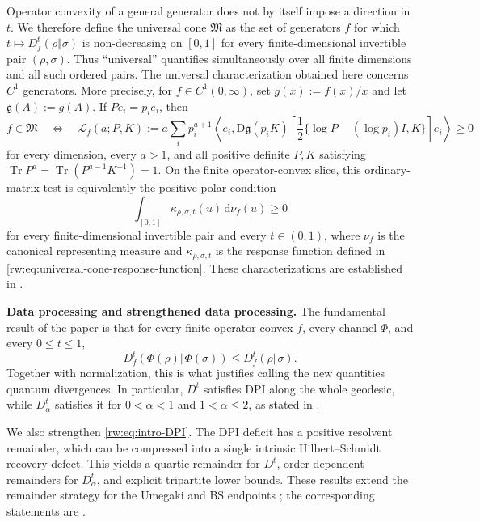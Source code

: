 \documentclass[11pt]{article}
\theoremstyle{remark}
\newcommand{\1}{\mathbbm{1}}
\begin{document}
Operator convexity of a general generator does not by itself impose
a direction in $t$.  We therefore define the universal cone
$\mathfrak M$ as the set of generators $f$ for which
$t\mapsto D_f^t(\rho\Vert\sigma)$ is non-decreasing on $[0,1]$ for
every finite-dimensional invertible pair $(\rho,\sigma)$.  Thus
``universal'' quantifies simultaneously over all finite dimensions
and all such ordered pairs.
The universal characterization obtained here concerns $C^1$
generators.  More precisely, for $f\in C^1(0,\infty)$, set
$g(x):=f(x)/x$ and let $\mathfrak g(A):=g(A)$.  If
$Pe_i=p_i e_i$, then
\begin{equation*}
 f\in\mathfrak M
 \quad\Longleftrightarrow\quad
 \mathcal L_f(a;P,K)
 :=a\sum_i p_i^{a+1}
 \left\langle e_i,
 \mathrm D\mathfrak g(p_iK)
 \left[\frac12\{\log P-(\log p_i)I,K\}\right]e_i
 \right\rangle\geq0
\end{equation*}
for every dimension, every $a>1$, and all positive definite $P,K$
satisfying
$\operatorname{Tr}P^a=\operatorname{Tr}(P^{a-1}K^{-1})=1$.
On the finite operator-convex slice, this ordinary-matrix test is
equivalently the positive-polar condition
\begin{equation*}
 \int_{[0,1]}\kappa_{\rho,\sigma,t}(u)\,
 \mathrm d\nu_f(u)\geq0
\end{equation*}
for every finite-dimensional invertible pair and every $t\in(0,1)$,
where $\nu_f$ is the canonical representing measure and
$\kappa_{\rho,\sigma,t}$ is the response function defined in
\eqref{rw:eq:universal-cone-response-function}.  These characterizations
are established in
.

\medskip
\noindent\textbf{Data processing and strengthened data processing.}
The fundamental result of the paper is that for every finite
operator-convex $f$, every channel $\Phi$, and every
$0\leq t\leq1$,
\begin{equation}
 \boxed{
 D_f^t\!\left(\Phi(\rho)\Vert\Phi(\sigma)\right)
 \leq D_f^t(\rho\Vert\sigma).}
 \label{rw:eq:intro-DPI}
\end{equation}
Together with normalization, this is what justifies calling the new
quantities quantum divergences.  In particular, $D^t$ satisfies DPI
along the whole geodesic, while $D_\alpha^t$ satisfies it for
$0<\alpha<1$ and $1<\alpha\leq2$, as stated in
.

We also strengthen \eqref{rw:eq:intro-DPI}.  The DPI deficit has a
positive resolvent remainder, which can be compressed into a single
intrinsic Hilbert--Schmidt recovery defect.  This yields a quartic
remainder for $D^t$, order-dependent remainders for $D_\alpha^t$,
and explicit tripartite lower bounds.  These results extend the
remainder strategy for the Umegaki and BS endpoints
\cite{carlen2018recovery,bluhm2020strengthened}; the corresponding
statements are
.
\end{document}
